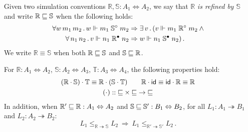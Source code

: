 \documentclass[sigplan,screen]{acmart}
\begin{document}
\begin{definition} %
Given two simulation conventions
$\mathbb{R}, \mathbb{S} : A_1 \Leftrightarrow A_2$,
we say that
\emph{$\mathbb{R}$ is refined by $\mathbb{S}$} and write
$\mathbb{R} \sqsubseteq \mathbb{S}$
when the following holds:
\begin{align*}
  \forall w \, m_1 \, m_2 \,.\,
  w \Vdash m_1 \mathrel{\mathbb{S}^\circ} m_2 &\Rightarrow
  \exists \, v \,.\, (
  v \Vdash m_1 \mathrel{\mathbb{R}^\circ} m_2
  \: \wedge \\
  \forall \, n_1 \, n_2 \,.\,
  v \Vdash n_1 \mathrel{\mathbb{R}^\bullet} n_2 &\Rightarrow
  w \Vdash n_1 \mathrel{\mathbb{S}^\bullet} n_2) \,.
\end{align*}
We write $\mathbb{R} \equiv \mathbb{S}$ when both
$\mathbb{R} \sqsubseteq \mathbb{S}$ and
$\mathbb{S} \sqsubseteq \mathbb{R}$.
\end{definition}

\begin{theorem} \label{thm:sccomp} %
For
$\mathbb{R} : A_1 \Leftrightarrow A_2$,
$\mathbb{S} : A_2 \Leftrightarrow A_3$,
$\mathbb{T} : A_3 \Leftrightarrow A_4$,
the following properties hold:
\begin{gather*}
  (\mathbb{R} \cdot \mathbb{S}) \cdot \mathbb{T} \equiv
    \mathbb{R} \cdot (\mathbb{S} \cdot \mathbb{T})
  \qquad
  \mathbb{R} \cdot  \mathsf{id}  \equiv
   \mathsf{id}  \cdot \mathbb{R} \equiv
  \mathbb{R}
  \\
  ({\cdot}) :: {{\sqsubseteq} \times {\sqsubseteq} \rightarrow {\sqsubseteq}}
\end{gather*}
In addition, when
$\mathbb{R}' \sqsubseteq \mathbb{R} : A_1 \Leftrightarrow A_2$ and
$\mathbb{S} \sqsubseteq \mathbb{S}' : B_1 \Leftrightarrow B_2$,
for all
$L_1 : A_1 \twoheadrightarrow B_1$ and $L_2 : A_2 \twoheadrightarrow B_2$:
\[
      L_1 \le_{\mathbb{R} \twoheadrightarrow \mathbb{S}} L_2
      \: \Rightarrow \:
      L_1 \le_{\mathbb{R}' \twoheadrightarrow \mathbb{S}'} L_2 \,.
\]
\end{theorem}
\end{document}
